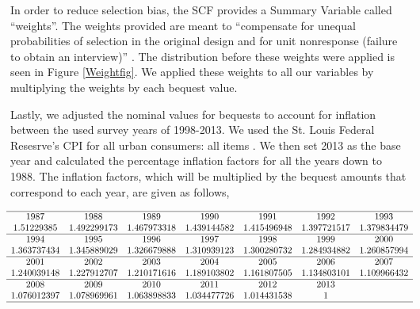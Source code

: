 \documentclass[letterpaper,12pt]{article}
\newcommand{\quotes}[1]{``#1''}
\theoremstyle{definition}
\begin{document}
\begin{spacing}{1.5}
 In order to reduce selection bias, the SCF provides a Summary Variable called \quotes{weights}. The weights provided are meant to \quotes{compensate for unequal probabilities of selection in the original design and for unit nonresponse (failure to obtain an interview)} \citet{FEDweight}. The distribution before these weights were applied is seen in Figure \ref{Weightfig}. We applied these weights to all our variables by multiplying the weights by each bequest value.


Lastly, we adjusted the nominal values for bequests to account for inflation between the used survey years of 1998-2013. We used the St. Louis Federal Resesrve's CPI for all urban consumers: all items \citet{StFed} . We then set 2013 as the base year and calculated the percentage inflation factors for all the years down to 1988. The inflation factors, which will be multiplied by the bequest amounts that correspond to each year, are given as follows,

\[
\begin{matrix}
\hline
1987&  1988&  1989&  1990&  1991&  1992&  1993\\

1.51229385 & 1.492299173& 1.467973318 & 1.439144582 & 1.415496948 & 1.397721517 & 1.379834479 \\
\hline

 1994&  1995&  1996& 1997&  1998&  1999&  2000\\

1.363737434 & 1.345889029 & 1.326679888 & 1.310939123 & 1.300280732 & 1.284934882 & 1.260857994  \\
\hline
 2001&2002&  2003&  2004&  2005&  2006 &2007\\

  1.240039148 & 1.227912707 & 1.210171616 & 1.189103802 & 1.161807505 & 1.134803101& 1.109966432  \\
  \hline

    2008&  2009&  2010&  2011&  2012&  2013\\

  1.076012397 & 1.078969961 & 1.063898833 & 1.034477726 & 1.014431538 & 1\\
\hline

\end{matrix}\] 


\end{spacing}
\end{document}
